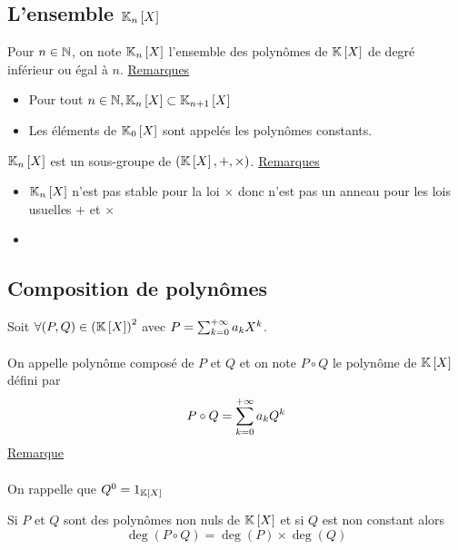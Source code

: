 \subsection{L’ensemble \(\mathbb{K}_n \left[X\right]\)}

\begin{defi}
    Pour \(n \in \mathbb{N}\), on note \(\mathbb{K}_n \left[X\right]\) l’ensemble des polynômes de \(\mathbb{K} \left[X\right]\) de degré inférieur ou égal à \(n\).
    \underline{Remarques}
    \begin{itemize}
        \item Pour tout \(n \in \mathbb{N}, \mathbb{K}_n \left[X\right] \subset \mathbb{K}_{n+1} \left[X\right]\)
        \item Les éléments de \(\mathbb{K}_0 \left[X\right]\) sont appelés les polynômes constants.
    \end{itemize}
\end{defi}

\begin{defprop}
    \(\mathbb{K}_n \left[X\right]\) est un sous-groupe de \(\left(\mathbb{K} \left[X\right] , +, \times\right)\).
    \underline{Remarques}
    \begin{itemize}
        \item  \(\mathbb{K}_n \left[X\right]\) n’est pas stable pour la loi \(\times\) donc n’est pas un anneau pour les lois usuelles \(+\) et \(\times\)
        \item 
    \end{itemize}
\end{defprop}

\subsection{Composition de polynômes}
\begin{defi}
    Soit \(\forall(P,Q) \in \left(\mathbb{K} \left[X\right]\right)^2\) avec \(P = \sum_{k=0}^{+\infty} a_k X^k\).\\~\\
    On appelle polynôme composé de \(P\) et \(Q\) et on note \(P \circ Q\) le polynôme de \(\mathbb{K} \left[X\right]\) défini par
    \[P\circ Q = \sum_{k = 0}^{+\infty} a_k Q^k\]
    \underline{Remarque}\\~\\
    On rappelle que \(Q^0 = 1_{\mathbb{K} \left[X\right]}\)
\end{defi}

\begin{defprop}[Degré]
    Si \(P\) et \(Q\) sont des polynômes non nuls de \(\mathbb{K} \left[X\right]\) et si \(Q\) est non constant alors
    \[\deg(P \circ Q) = \deg(P ) \times \deg(Q)\]
\end{defprop}
